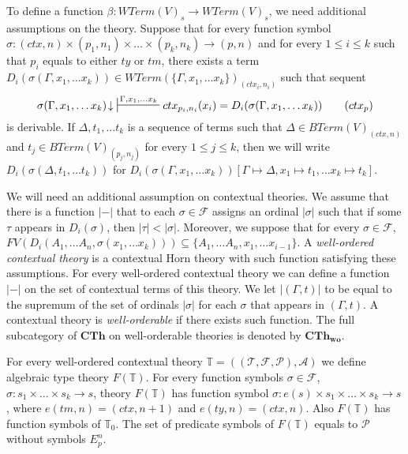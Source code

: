 \documentclass[reqno]{amsart}
\newcommand{\axtag}[1]{\label{ax:#1} \tag{#1}}
\theoremstyle{definition}
\theoremstyle{remark}
\newcommand{\cat}[1]{\mathbf{#1}}
\newcommand{\CTh}{\cat{CTh}}
\newcommand{\woCTh}{\cat{CTh_{wo}}}
\numberwithin{figure}{section}
\begin{document}
To define a function $\beta : WTerm(V)_s \to WTerm(V)_s$, we need additional assumptions on the theory.
Suppose that for every function symbol $\sigma : (ctx,n) \times (p_1,n_1) \times \ldots \times (p_k,n_k) \to (p,n)$
    and for every $1 \leq i \leq k$ such that $p_i$ equals to either $ty$ or $tm$,
    there exists a term $D_i(\sigma(\Gamma, x_1, \ldots x_k)) \in WTerm(\{ \Gamma, x_1, \ldots x_k \})_{(ctx_i,n_i)}$ such that sequent
\begin{equation}
\sigma(\Gamma, x_1, \ldots x_k)\!\downarrow\ \sststile{}{\Gamma, x_1, \ldots x_k} ctx_{p_i,n_i}(x_i) = D_i(\sigma(\Gamma, x_1, \ldots x_k)) \axtag{$ctx_p$}
\end{equation}
is derivable.
If $\Delta, t_1, \ldots t_k$ is a sequence of terms such that $\Delta \in BTerm(V)_{(ctx,n)}$ and $t_j \in BTerm(V)_{(p_j,n_j)}$ for every $1 \leq j \leq k$,
    then we will write $D_i(\sigma(\Delta, t_1, \ldots t_k))$ for $D_i(\sigma(\Gamma, x_1, \ldots x_k))[\Gamma \mapsto \Delta, x_1 \mapsto t_1, \ldots x_k \mapsto t_k]$.

We will need an additional assumption on contextual theories.
We assume that there is a function $|-|$ that to each $\sigma \in \mathcal{F}$ assigns an ordinal $|\sigma|$ such that if some $\tau$ appears in $D_i(\sigma)$, then $|\tau| < |\sigma|$.
Moreover, we suppose that for every $\sigma \in \mathcal{F}$, $FV(D_i(A_1, \ldots A_n, \sigma(x_1, \ldots x_k))) \subseteq \{ A_1, \ldots A_n, x_1, \ldots x_{i-1} \}$.
A \emph{well-ordered contextual theory} is a contextual Horn theory with such function satisfying these assumptions.
For every well-ordered contextual theory we can define a function $|-|$ on the set of contextual terms of this theory.
We let $|(\Gamma,t)|$ to be equal to the supremum of the set of ordinals $|\sigma|$ for each $\sigma$ that appears in $(\Gamma,t)$.
A contextual theory is \emph{well-orderable} if there exists such function.
The full subcategory of $\CTh$ on well-orderable theories is denoted by $\woCTh$.

For every well-ordered contextual theory $\mathbb{T} = ((\mathcal{T},\mathcal{F},\mathcal{P}),\mathcal{A})$ we define algebraic type theory $F(\mathbb{T})$.
For every function symbols $\sigma \in \mathcal{F}$, $\sigma : s_1 \times \ldots \times s_k \to s$,
    theory $F(\mathbb{T})$ has function symbol $\sigma : e(s) \times s_1 \times \ldots \times s_k \to s$,
    where $e(tm,n) = (ctx,n+1)$ and $e(ty,n) = (ctx,n)$.
Also $F(\mathbb{T})$ has function symbols of $\mathbb{T}_0$.
The set of predicate symbols of $F(\mathbb{T})$ equals to $\mathcal{P}$ without symbols $E^n_p$.
\end{document}
